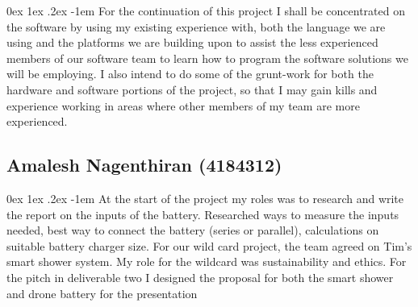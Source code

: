 \documentclass[12pt, a4paper]{article}
\makeatletter
\renewcommand\paragraph{\@startsection{paragraph}{5}{\parindent}%
  {0ex \@plus1ex \@minus.2ex}%
  {-1em}%
  {\normalfont\normalsize\bfseries}}
\makeatother
\begin{document}
                \paragraph{}
                    For the continuation of this project I shall be concentrated on the software by using my existing experience with, both the language we are using 
                    and the platforms we are building upon to assist the less experienced members of our software team to learn how to program the software solutions 
                    we will be employing. I also intend to do some of the grunt-work for both the hardware and software portions of the project, so that I may gain 
                    kills and experience working in areas where other members of my team are more experienced.
            \subsection{Amalesh Nagenthiran (4184312)}
                \paragraph{}
                    At the start of the project my roles was to research and write the report on the inputs of the battery. Researched ways to measure the inputs 
                    needed, best way to connect the battery (series or parallel), calculations on suitable battery charger size. For our wild card project, the team 
                    agreed on Tim’s smart shower system. My role for the wildcard was sustainability and ethics. For the pitch in deliverable two I designed the 
                    proposal for both the smart shower and drone battery for the presentation
\end{document}
